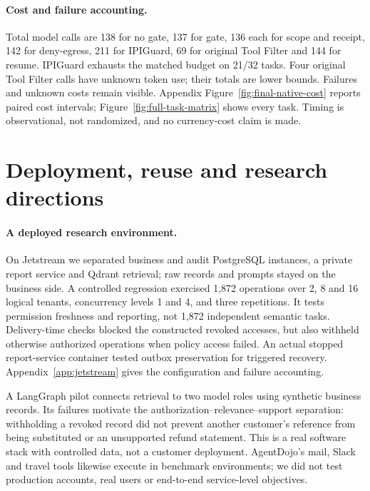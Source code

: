 \paragraph{Cost and failure accounting.}\label{sec:cost}
Total model calls are 138 for no gate, 137 for gate, 136 each for scope and
receipt, 142 for deny-egress, 211 for IPIGuard, 69 for original Tool Filter and
144 for resume. IPIGuard exhausts the matched budget on 21/32 tasks. Four original
Tool Filter calls have unknown token use; their totals are lower bounds.
Failures and unknown costs remain visible. Appendix Figure~\ref{fig:final-native-cost}
reports paired cost intervals; Figure~\ref{fig:full-task-matrix} shows every task.
Timing is observational, not randomized, and no currency-cost claim is made.

\FloatBarrier
\section{Deployment, reuse and research directions}
\label{sec:deployment-reuse}
\paragraph{A deployed research environment.}
On Jetstream we separated business and audit PostgreSQL instances, a private
report service and Qdrant retrieval; raw records and prompts stayed on the
business side. A controlled regression exercised 1,872 operations over 2, 8 and
16 logical tenants, concurrency levels 1 and 4, and three repetitions. It tests
permission freshness and reporting, not 1,872 independent semantic tasks.
Delivery-time checks blocked the constructed revoked accesses, but also withheld
otherwise authorized operations when policy access failed. An actual stopped
report-service container tested outbox preservation for triggered recovery.
Appendix~\ref{app:jetstream} gives the configuration and failure accounting.

A LangGraph pilot connects retrieval to two model roles using synthetic business
records. Its failures motivate the authorization--relevance--support separation:
withholding a revoked record did not prevent another customer's reference from
being substituted or an unsupported refund statement. This is a real software
stack with controlled data, not a customer deployment. AgentDojo's mail, Slack
and travel tools likewise execute in benchmark environments; we did not test
production accounts, real users or end-to-end service-level objectives.

